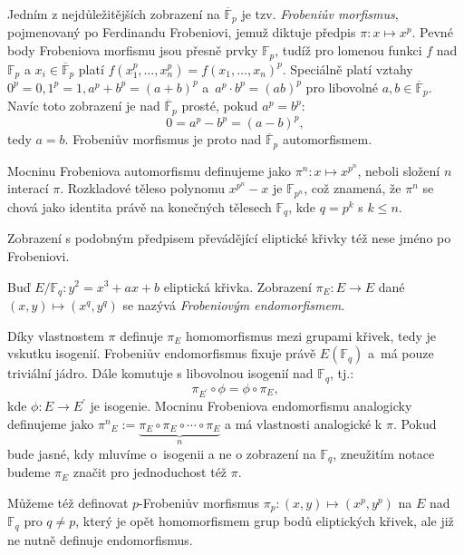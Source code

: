 \documentclass[12pt]{report}
\begin{document}
Jedním z nejdůležitějších zobrazení na $\overline{\mathbb{F}}_p$ je tzv. \textit{Frobeniův morfismus}, pojmenovaný po Ferdinandu Frobeniovi, jemuž diktuje předpis $\pi: x \mapsto x^p$. Pevné body Frobeniova morfismu jsou přesně prvky $\mathbb{F}_p$, tudíž pro lomenou funkci $f$ nad $\mathbb{F}_p$ a $x_i \in \overline{\mathbb{F}}_p$ platí $f(x_1^p,\dots,x_n^p)=f(x_1,\dots,x_n)^p$. Speciálně platí vztahy $0^p = 0, 1^p = 1, a^p + b^p = (a+b)^p$ a~$a^p \cdot b^p = (ab)^p$ pro libovolné $a,b \in \overline{\mathbb{F}}_p$. Navíc toto zobrazení je nad $\overline{\mathbb{F}}_p$ prosté, pokud $a^p = b^p$:
\begin{equation*}
0 = a^p - b^p =  (a-b)^p,
\end{equation*} tedy $a=b$. Frobeniův morfismus je proto nad $\overline{\mathbb{F}}_p$ automorfismem.

Mocninu Frobeniova automorfismu definujeme jako $\pi^n : x \mapsto x^{p^n}$, neboli složení $n$ interací $\pi$. Rozkladové těleso polynomu $x^{p^n}-x$ je $\mathbb{F}_{p^n}$, což znamená, že $\pi^n$ se chová jako identita právě na konečných tělesech $\mathbb{F}_q$, kde $q =p^k$ s $k \leqslant n$. 

Zobrazení s podobným předpisem převádějící eliptické křivky též nese jméno po Frobeniovi.
\begin{definice}
Buď $E/\mathbb{F}_q: y^2 = x^3+ax+b$ eliptická křivka. Zobrazení $\pi_E : E \longrightarrow E$ dané $(x,y) \longmapsto (x^q,y^q)$ se nazývá \textit{Frobeniovým endomorfismem}.
\end{definice}

Díky vlastnostem $\pi$ definuje $\pi_E$ homomorfismus mezi grupami křivek, tedy je vskutku isogenií. Frobeniův endomorfismus fixuje právě $E(\mathbb{F}_q)$ a~má pouze triviální jádro. Dále komutuje s libovolnou isogenií nad $\mathbb{F}_q$, tj.:
\begin{equation*}
\pi_{E^\prime} \circ \phi = \phi \circ \pi_E,
\end{equation*}
kde $\phi : E \longrightarrow E^\prime$ je isogenie. Mocninu Frobeniova endomorfismu analogicky definujeme jako ${\pi^n}_E := \underbrace{\pi_E \circ \pi_E \circ \cdots \circ \pi_E}_{n}$ a má vlastnosti analogické k $\pi$. Pokud bude jasné, kdy mluvíme o~isogenii a ne o zobrazení na $\mathbb{F}_q$, zneužitím notace budeme $\pi_E$ značit pro jednoduchost též $\pi$.

Můžeme též definovat $p$-Frobeniův morfismus $\pi_p : (x,y) \mapsto (x^p,y^p)$ na $E$ nad $\mathbb{F}_q$ pro $q \neq p$, který je opět homomorfismem grup bodů eliptických křivek, ale již ne nutně definuje endomorfismus.
\end{document}
